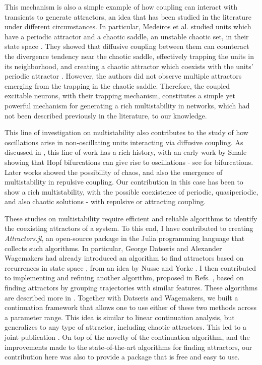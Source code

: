 This mechanism is also a simple example of how coupling can interact with transients to generate attractors, an idea that has been studied in the literature under different circumstances. In particular, Medeiros et al. studied units which have a periodic attractor and a chaotic saddle, an unstable chaotic set, in their state space \cite{medeiros2018boundaries, medeiros2019state}. They showed that diffusive coupling between them can counteract the divergence tendency near the chaotic saddle, effectively trapping the units in its neighborhood, and creating a chaotic attractor which coexists with the units' periodic attractor \cite{medeiros2018boundaries, medeiros2019state}. However, the authors did not observe multiple attractors emerging from the trapping in the chaotic saddle. Therefore, the coupled excitable neurons, with their trapping mechanism, constitutes a simple yet powerful mechanism for generating a rich multistability in networks, which had not been described previously in the literature, to our knowledge.

This line of investigation on multistability also contributes to the study of how oscillations arise in non-oscillating units interacting via diffusive coupling. As discussed in , this line of work has a rich history, with an early work by Smale showing that Hopf bifurcations can give rise to oscillations \cite{smale1976a} - see  for bifurcations. Later works showed the possibility of chaos, and also the emergence of multistability in repulsive coupling. Our contribution in this case has been to show a rich multistability, with the possible coexistence of periodic, quasiperiodic, and also chaotic solutions - with repulsive or attracting coupling. 

These studies on multistability require efficient and reliable algorithms to identify the coexisting attractors of a system. To this end, I have contributed to creating \textit{Attractors.jl}, an open-source package in the Julia programming language that collects such algorithms. In particular, George Datseris and Alexander Wagemakers had already introduced an algorithm to find attractors based on recurrences in state space \cite{datseris2022effortless}, from an idea by Nusse and Yorke \cite{nusse1994dynamics}. I then contributed to implementing and refining another algorithm, proposed in Refs. \cite{stender2021bstab, gelbrecht2020monte}, based on finding attractors by grouping trajectories with similar features. These algorithms are described more in . Together with Datseris and Wagemakers, we built a continuation framework that allows one to use either of these two methods across a parameter range. This idea is similar to linear continuation analysis, but generalizes to any type of attractor, including chaotic attractors. This led to a joint publication \cite{datseris2023framework}. On top of the novelty of the continuation algorithm, and the improvements made to the state-of-the-art algorithms for finding attractors, our contribution here was also to provide a package that is free and easy to use. 

